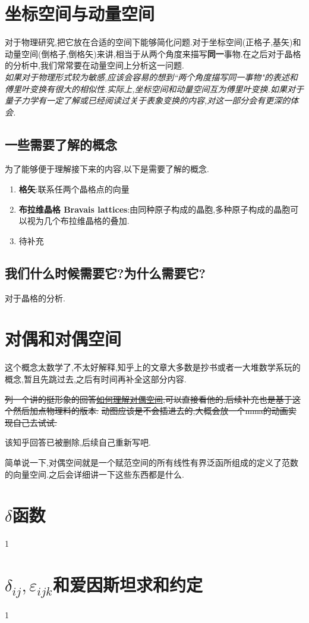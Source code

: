 \documentclass[lang=cn,newtx,10pt,scheme=chinese,thmcnt=section]{elegantbook}
\begin{document}
\chapter{坐标空间与动量空间}
对于物理研究,把它放在合适的空间下能够简化问题.对于坐标空间(正格子,基矢)和动量空间(倒格子,倒格矢)来讲,相当于从两个角度来描写\textbf{同一}事物.在之后对于晶格的分析中,我们常常要在动量空间上分析这一问题.\\
\textit{如果对于物理形式较为敏感,应该会容易的想到``两个角度描写同一事物"的表述和傅里叶变换有很大的相似性.实际上,坐标空间和动量空间互为傅里叶变换.如果对于量子力学有一定了解或已经阅读过关于表象变换的内容,对这一部分会有更深的体会.}
\section*{一些需要了解的概念}
为了能够便于理解接下来的内容,以下是需要了解的概念.
\begin{enumerate}
	\item \textbf{格矢}:联系任两个晶格点的向量
	\item \textbf{布拉维晶格 Bravais lattices}:由同种原子构成的晶胞,多种原子构成的晶胞可以视为几个布拉维晶格的叠加.
	\item 待补充
\end{enumerate}
\section*{我们什么时候需要它?为什么需要它?}
对于晶格的分析.
\chapter{对偶和对偶空间}
这个概念太数学了,不太好解释,知乎上的文章大多数是抄书或者一大堆数学系玩的概念,暂且先跳过去,之后有时间再补全这部分内容.

\sout{列一个讲的挺形象的回答\href{https://www.zhihu.com/question/38464481/answer/23567212}{如何理解对偶空间},可以直接看他的,后续补充也是基于这个然后加点物理料的版本.}
\sout{动图应该是不会插进去的,大概会放一个mma的动画实现自己去试试.}

该知乎回答已被删除,后续自己重新写吧.

简单说一下,对偶空间就是一个赋范空间的所有线性有界泛函所组成的定义了范数的向量空间.之后会详细讲一下这些东西都是什么.
\chapter{$\delta$函数}
1
\chapter{$\delta_{ij},\varepsilon_{ijk}$和爱因斯坦求和约定}
1
\end{document}
